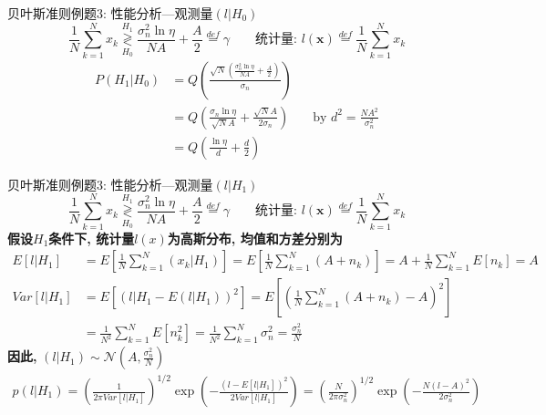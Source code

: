 \begin{frame}[shrink]{贝叶斯准则例题3: 性能分析---观测量$(l|H_0)$}
\[
\frac{1}{N}\sum\limits_{k=1}^{N}x_k\mathop{\gtrless}\limits_{H_0}^{H_1}\frac{\sigma_n^2\ln\eta}{NA}+\frac{A}{2}\mathop{=}\limits^{def}\gamma \qquad \textbf{统计量: }l(\bm{x})\mathop{=}\limits^{def}\frac{1}{N}\sum\limits_{k=1}^{N}x_k
\]
\begin{align*}
P(H_1|H_0)&=Q\left(\frac{\sqrt{N}\left(\frac{\sigma_n^2\ln\eta}{NA}+\frac{A}{2}\right)}{\sigma_n}\right)\\
&=Q\left(\frac{\sigma_n\ln\eta}{\sqrt{N}A}+\frac{\sqrt{N}A}{2\sigma_n}\right)&& \text{by }d^2=\frac{NA^2}{\sigma_n^2}\\
&=Q\left(\frac{\ln\eta}{d}+\frac{d}{2}\right)
\end{align*}
\end{frame}

\begin{frame}[shrink]{贝叶斯准则例题3: 性能分析---观测量$(l|H_1)$}
\[
\frac{1}{N}\sum\limits_{k=1}^{N}x_k\mathop{\gtrless}\limits_{H_0}^{H_1}\frac{\sigma_n^2\ln\eta}{NA}+\frac{A}{2}\mathop{=}\limits^{def}\gamma \qquad \textbf{统计量: }l(\bm{x})\mathop{=}\limits^{def}\frac{1}{N}\sum\limits_{k=1}^{N}x_k
\]
\textbf{假设$H_1$条件下, 统计量$l(x)$为高斯分布, 均值和方差分别为}
\begin{align*}
E[l|H_1]&=E\left[\frac{1}{N}\sum\limits_{k=1}^{N}(x_k|H_1)\right]=E\left[\frac{1}{N}\sum\limits_{k=1}^{N}(A+n_k)\right]=A+\frac{1}{N}\sum\limits_{k=1}^{N}E[n_k]=A\\
Var[l|H_1]&=E\left[(l|H_1-E(l|H_1))^2\right]=E\left[\left(\frac{1}{N}\sum\limits_{k=1}^{N}(A+n_k)-A\right)^2\right]\\
&=\frac{1}{N^2}\sum\limits_{k=1}^{N}E[n_k^2]=\frac{1}{N^2}\sum\limits_{k=1}^{N}\sigma_n^2=\frac{\sigma_n^2}{N}
\end{align*}
\textbf{因此, }$(l|H_1)\sim\mathcal{N}(A,\frac{\sigma_n^2}{N})$
\begin{align*}
p(l|H_1)=\left(\frac{1}{2\pi Var[l|H_1]}\right)^{1/2}\exp\left(-\frac{(l-E[l|H_1])^2}{2 Var[l|H_1]}\right)=\left(\frac{N}{2\pi\sigma_n^2}\right)^{1/2}\exp\left(-\frac{N(l-A)^2}{2\sigma_n^2}\right)
\end{align*}
\end{frame}

